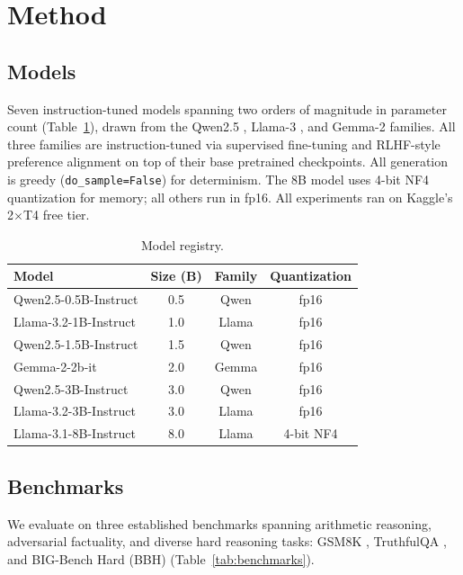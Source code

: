 \documentclass{article}
\begin{document}
\section{Method}

\subsection{Models}
\label{sec:models}

Seven instruction-tuned models spanning two orders of magnitude in parameter count (Table~\ref{tab:models}), drawn from the Qwen2.5 \citep{qwen2024technical}, Llama-3 \citep{grattafiori2024llama3}, and Gemma-2 \citep{gemmateam2024gemma2} families. All three families are instruction-tuned via supervised fine-tuning and RLHF-style preference alignment \citep{ouyang2022instructgpt} on top of their base pretrained checkpoints. All generation is greedy (\texttt{do\_sample=False}) for determinism. The 8B model uses 4-bit NF4 quantization \citep{dettmers2023qlora} for memory; all others run in fp16. All experiments ran on Kaggle's 2$\times$T4 free tier.

\begin{table}[h]
\centering
\caption{Model registry.}
\label{tab:models}
\begin{tabular}{lccc}
\toprule
Model & Size (B) & Family & Quantization \\
\midrule
Qwen2.5-0.5B-Instruct   & 0.5 & Qwen  & fp16 \\
Llama-3.2-1B-Instruct   & 1.0 & Llama & fp16 \\
Qwen2.5-1.5B-Instruct   & 1.5 & Qwen  & fp16 \\
Gemma-2-2b-it           & 2.0 & Gemma & fp16 \\
Qwen2.5-3B-Instruct     & 3.0 & Qwen  & fp16 \\
Llama-3.2-3B-Instruct   & 3.0 & Llama & fp16 \\
Llama-3.1-8B-Instruct   & 8.0 & Llama & 4-bit NF4 \\
\bottomrule
\end{tabular}
\end{table}

\subsection{Benchmarks}

We evaluate on three established benchmarks spanning arithmetic reasoning, adversarial factuality, and diverse hard reasoning tasks: GSM8K \citep{cobbe2021gsm8k}, TruthfulQA \citep{lin2022truthfulqa}, and BIG-Bench Hard (BBH) \citep{suzgun2023bbh} (Table~\ref{tab:benchmarks}).
\end{document}
